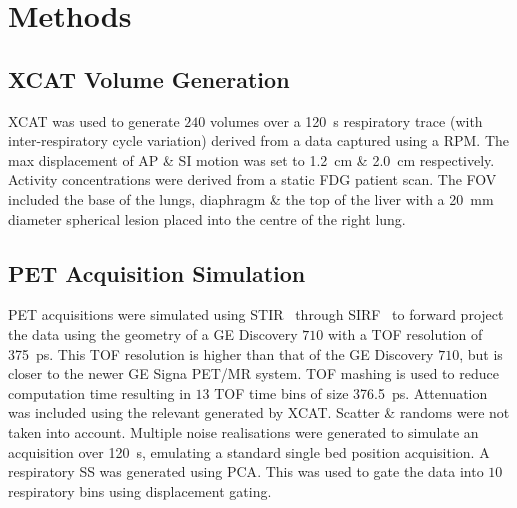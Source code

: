 \vspace{-0.75cm}

\section{Methods} \label{sec:methods}
    \subsection{XCAT Volume Generation} \label{sec:xcat_volume_generation}
        \gls{XCAT}%
        was used to generate $240$ volumes over a \SI{120}{\second} respiratory trace (with inter-respiratory cycle variation) derived from a data captured using a \gls{RPM}. The max displacement of \gls{AP} \& \gls{SI} motion was set to \SI{1.2}{\centi\metre} \& \SI{2.0}{\centi\metre} respectively. Activity concentrations were derived from a static \gls{FDG} patient scan. The \gls{FOV} included the base of the lungs, diaphragm \& the top of the liver with a \SI{20}{\milli\metre} diameter spherical lesion placed into the centre of the right lung.
    
    \vspace{-0.5cm}
    
    \subsection{PET Acquisition Simulation} \label{sec:pet_acquisition_simulation}
        \gls{PET} acquisitions were simulated %
        using \gls{STIR}~\cite{Thielemans2012, Efthimiou2018} through \gls{SIRF}~\cite{ Ovtchinnikov2019CCPPETMRSIRF} to forward project the data using the geometry of a \gls{GE} Discovery $710$ with a \gls{TOF} resolution of \SI{375}{\pico\second}. This \gls{TOF} resolution is higher than that of the \gls{GE} Discovery $710$, but is closer to the newer \gls{GE} Signa \gls{PET}/\gls{MR} system. \gls{TOF} mashing is used to reduce computation time resulting in $13$ \gls{TOF} time bins of size \SI{376.5}{\pico\second}. Attenuation was included using the relevant  generated by \gls{XCAT}. Scatter \& randoms were not taken into account. Multiple noise realisations were generated to simulate an acquisition over \SI{120}{\second}, emulating a standard single bed position acquisition. A respiratory \gls{SS} was generated using \gls{PCA}.%
        This was used to gate the data into $10$ respiratory bins using displacement gating.%
    
